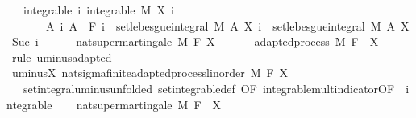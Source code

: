 \begin{isabellebody}
\ \ \ integrable{\isacharcolon}{\kern0pt}\ {\isachardoublequoteopen}{\isasymAnd}i{\isachardot}{\kern0pt}\ integrable\ M\ {\isacharparenleft}{\kern0pt}X\ i{\isacharparenright}{\kern0pt}{\isachardoublequoteclose}\ \isanewline
\ \ \ \ \ \ \ {\isachardoublequoteopen}{\isasymAnd}A\ i{\isachardot}{\kern0pt}\ A\ {\isasymin}\ F\ i\ {\isasymLongrightarrow}\ set{\isacharunderscore}{\kern0pt}lebesgue{\isacharunderscore}{\kern0pt}integral\ M\ A\ {\isacharparenleft}{\kern0pt}X\ i{\isacharparenright}{\kern0pt}\ {\isasymge}\ set{\isacharunderscore}{\kern0pt}lebesgue{\isacharunderscore}{\kern0pt}integral\ M\ A\ {\isacharparenleft}{\kern0pt}X\ {\isacharparenleft}{\kern0pt}Suc\ i{\isacharparenright}{\kern0pt}{\isacharparenright}{\kern0pt}{\isachardoublequoteclose}\ \isanewline
\ \ \ \ \ {\isachardoublequoteopen}nat{\isacharunderscore}{\kern0pt}supermartingale\ M\ F\ X{\isachardoublequoteclose}\isanewline
%
\isadelimproof
%
\endisadelimproof
%
\isatagproof
{}\isamarkupfalse%
\ {\isacharminus}{\kern0pt}\isanewline
\ \ \isamarkupfalse%
\ {\isacharunderscore}{\kern0pt}{\isacharcolon}{\kern0pt}\ adapted{\isacharunderscore}{\kern0pt}process\ M\ F\ {}\ {\isachardoublequoteopen}{\isacharminus}{\kern0pt}X{\isachardoublequoteclose}\ \isamarkupfalse%
\ {\isacharparenleft}{\kern0pt}rule\ uminus{\isacharunderscore}{\kern0pt}adapted{\isacharparenright}{\kern0pt}\isanewline
\ \ \isamarkupfalse%
\ uminus{\isacharunderscore}{\kern0pt}X{\isacharcolon}{\kern0pt}\ nat{\isacharunderscore}{\kern0pt}sigma{\isacharunderscore}{\kern0pt}finite{\isacharunderscore}{\kern0pt}adapted{\isacharunderscore}{\kern0pt}process{\isacharunderscore}{\kern0pt}linorder\ M\ F\ {\isachardoublequoteopen}{\isacharminus}{\kern0pt}X{\isachardoublequoteclose}\ \isacommand{{\isachardot}{\kern0pt}{\isachardot}{\kern0pt}}\isamarkupfalse%
\isanewline
\ \ \isamarkupfalse%
\ {\isacharasterisk}{\kern0pt}\ {\isacharequal}{\kern0pt}\ set{\isacharunderscore}{\kern0pt}integral{\isacharunderscore}{\kern0pt}uminus{\isacharbrackleft}{\kern0pt}unfolded\ set{\isacharunderscore}{\kern0pt}integrable{\isacharunderscore}{\kern0pt}def{\isacharcomma}{\kern0pt}\ OF\ integrable{\isacharunderscore}{\kern0pt}mult{\isacharunderscore}{\kern0pt}indicator{\isacharbrackleft}{\kern0pt}OF\ {\isacharunderscore}{\kern0pt}\ integrable{\isacharbrackright}{\kern0pt}{\isacharbrackright}{\kern0pt}\isanewline
\ \ \isamarkupfalse%
\ {\isachardoublequoteopen}nat{\isacharunderscore}{\kern0pt}supermartingale\ M\ F\ {\isacharparenleft}{\kern0pt}{\isacharminus}{\kern0pt}{\isacharparenleft}{\kern0pt}{\isacharminus}{\kern0pt}\ X{\isacharparenright}{\kern0pt}{\isacharparenright}{\kern0pt}{\isachardoublequoteclose}\ \isanewline

\end{isabellebody}
